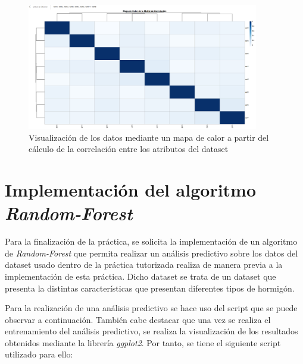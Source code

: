 \documentclass[11pt]{report}
\begin{document}
\begin{figure}[H]
  \centering
  \includegraphics[width=0.9\textwidth]{./img/Heat-Map-Correlation-Image.png}
  \caption{Visualización de los datos mediante un mapa de calor a partir del cálculo de la correlación entre los atributos del dataset}
  \label{fig:heatmap}
\end{figure}

\chapter{Implementación del algoritmo \emph{Random-Forest}}

Para la finalización de la práctica, se solicita la implementación de un algoritmo de \emph{Random-Forest} que permita realizar un análisis predictivo sobre los datos del dataset usado dentro de la práctica tutorizada realiza de manera previa a la implementación de esta práctica. Dicho dataset se trata de un dataset que presenta la distintas características que presentan diferentes tipos de hormigón.

Para la realización de una análisis predictivo se hace uso del script que se puede observar a continuación. También cabe destacar que una vez se realiza el entrenamiento del análisis predictivo, se realiza la visualización de los resultados obtenidos mediante la librería \emph{ggplot2}. Por tanto, se tiene el siguiente script utilizado para ello:
\end{document}
